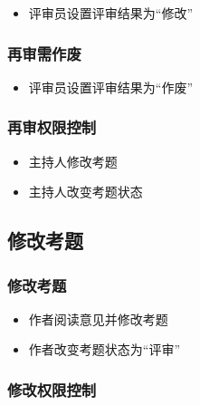 \documentclass[hyperref, a4paper]{ctexart}
\providecommand{\tightlist}{%
  \setlength{\itemsep}{0pt}\setlength{\parskip}{0pt}}
\begin{document}
\begin{itemize}
\tightlist
\item
  评审员设置评审结果为``修改''
\end{itemize}

\hypertarget{ux518dux5ba1ux9700ux4f5cux5e9f}{%
\subsubsection{再审需作废}\label{ux518dux5ba1ux9700ux4f5cux5e9f}}

\begin{itemize}
\tightlist
\item
  评审员设置评审结果为``作废''
\end{itemize}

\hypertarget{ux518dux5ba1ux6743ux9650ux63a7ux5236}{%
\subsubsection{再审权限控制}\label{ux518dux5ba1ux6743ux9650ux63a7ux5236}}

\begin{itemize}
\tightlist
\item
  主持人修改考题
\item
  主持人改变考题状态
\end{itemize}

\hypertarget{ux4feeux6539ux8003ux9898}{%
\subsection{修改考题}\label{ux4feeux6539ux8003ux9898}}

\hypertarget{ux4feeux6539ux8003ux9898-1}{%
\subsubsection{修改考题}\label{ux4feeux6539ux8003ux9898-1}}

\begin{itemize}
\tightlist
\item
  作者阅读意见并修改考题
\item
  作者改变考题状态为``评审''
\end{itemize}

\hypertarget{ux4feeux6539ux6743ux9650ux63a7ux5236}{%
\subsubsection{修改权限控制}\label{ux4feeux6539ux6743ux9650ux63a7ux5236}}
\end{document}
